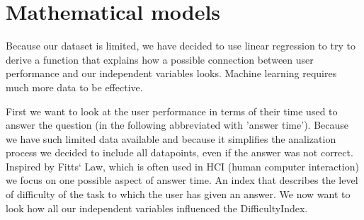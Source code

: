 
\chapter{Mathematical models}
Because our dataset is limited, we have decided to use linear regression to try to derive a function that explains how
a possible connection between user performance and our independent variables looks. Machine learning requires much more
data to be effective.

First we want to look at the user performance in terms of their time used to answer the question (in the following
abbreviated with 'answer time'). Because we have such limited data available and because it simplifies the analization
process we decided to include all datapoints, even if the answer was not correct.
Inspired by Fitts‘ Law, which is often used in HCI (human computer interaction) we focus on one possible aspect of answer
time. An index that describes the level of difficulty of the task to which the user has given an answer. We now want to
look how all our independent variables influenced the DifficultyIndex.
